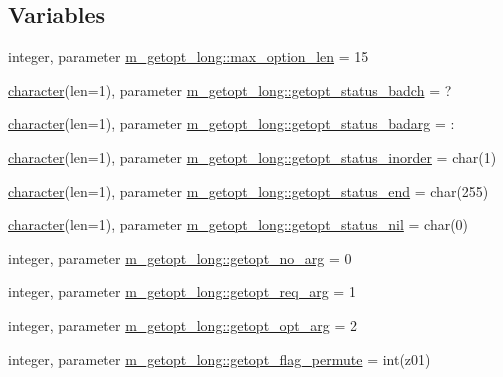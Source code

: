 \subsection*{Variables}
\begin{DoxyCompactItemize}
\item 
integer, parameter \hyperlink{namespacem__getopt__long_aa7e9d6f7c81a30df80cba5f518928d0b}{m\+\_\+getopt\+\_\+long\+::max\+\_\+option\+\_\+len} = 15
\item 
\hyperlink{option__stopwatch_83_8txt_abd4b21fbbd175834027b5224bfe97e66}{character}(len=1), parameter \hyperlink{namespacem__getopt__long_aaad9b6ad61f0e854d6f5e0be5d6a8391}{m\+\_\+getopt\+\_\+long\+::getopt\+\_\+status\+\_\+badch} = \textquotesingle{}?\textquotesingle{}
\item 
\hyperlink{option__stopwatch_83_8txt_abd4b21fbbd175834027b5224bfe97e66}{character}(len=1), parameter \hyperlink{namespacem__getopt__long_a0cbf9b0b301392332f65c12012615ed5}{m\+\_\+getopt\+\_\+long\+::getopt\+\_\+status\+\_\+badarg} = \textquotesingle{}\+:\textquotesingle{}
\item 
\hyperlink{option__stopwatch_83_8txt_abd4b21fbbd175834027b5224bfe97e66}{character}(len=1), parameter \hyperlink{namespacem__getopt__long_ab062153fe30e93d68542fdcb607c84f0}{m\+\_\+getopt\+\_\+long\+::getopt\+\_\+status\+\_\+inorder} = char(1)
\item 
\hyperlink{option__stopwatch_83_8txt_abd4b21fbbd175834027b5224bfe97e66}{character}(len=1), parameter \hyperlink{namespacem__getopt__long_adb2768994ee191e282dda42a22ded93e}{m\+\_\+getopt\+\_\+long\+::getopt\+\_\+status\+\_\+end} = char(255)
\item 
\hyperlink{option__stopwatch_83_8txt_abd4b21fbbd175834027b5224bfe97e66}{character}(len=1), parameter \hyperlink{namespacem__getopt__long_a17bc8c03e862e68f855f3c85740fe4c2}{m\+\_\+getopt\+\_\+long\+::getopt\+\_\+status\+\_\+nil} = char(0)
\item 
integer, parameter \hyperlink{namespacem__getopt__long_a08dabd255fb1dc8cb7aee58aaf55f916}{m\+\_\+getopt\+\_\+long\+::getopt\+\_\+no\+\_\+arg} = 0
\item 
integer, parameter \hyperlink{namespacem__getopt__long_a52b32d94a183ff13b4a8bf9c14e5634a}{m\+\_\+getopt\+\_\+long\+::getopt\+\_\+req\+\_\+arg} = 1
\item 
integer, parameter \hyperlink{namespacem__getopt__long_a1750a2d60da545a36608d1d458dd6a89}{m\+\_\+getopt\+\_\+long\+::getopt\+\_\+opt\+\_\+arg} = 2
\item 
integer, parameter \hyperlink{namespacem__getopt__long_ac2ae1f0969388b7868cb7b070abbff70}{m\+\_\+getopt\+\_\+long\+::getopt\+\_\+flag\+\_\+permute} = int(z\textquotesingle{}01\textquotesingle{})

\end{DoxyCompactItemize}
